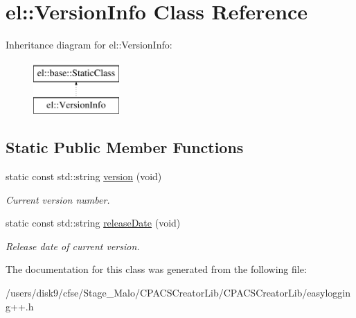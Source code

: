 \hypertarget{classel_1_1VersionInfo}{\section{el\-:\-:Version\-Info Class Reference}
\label{classel_1_1VersionInfo}
}
Inheritance diagram for el\-:\-:Version\-Info\-:\begin{figure}[H]
\begin{center}
\leavevmode
\includegraphics[height=2.000000cm]{classel_1_1VersionInfo}
\end{center}
\end{figure}
\subsection*{Static Public Member Functions}
\begin{DoxyCompactItemize}
\item 
\hypertarget{classel_1_1VersionInfo_a6fee512d52168445b2118ff2b31b4058}{static const std\-::string \hyperlink{classel_1_1VersionInfo_a6fee512d52168445b2118ff2b31b4058}{version} (void)}\label{classel_1_1VersionInfo_a6fee512d52168445b2118ff2b31b4058}

\begin{DoxyCompactList}\small\item\em Current version number. \end{DoxyCompactList}\item 
\hypertarget{classel_1_1VersionInfo_ab23c2545115898f4071fa4e125204946}{static const std\-::string \hyperlink{classel_1_1VersionInfo_ab23c2545115898f4071fa4e125204946}{release\-Date} (void)}\label{classel_1_1VersionInfo_ab23c2545115898f4071fa4e125204946}

\begin{DoxyCompactList}\small\item\em Release date of current version. \end{DoxyCompactList}\end{DoxyCompactItemize}


The documentation for this class was generated from the following file\-:\begin{DoxyCompactItemize}
\item 
/users/disk9/cfse/\-Stage\-\_\-\-Malo/\-C\-P\-A\-C\-S\-Creator\-Lib/\-C\-P\-A\-C\-S\-Creator\-Lib/easylogging++.\-h\end{DoxyCompactItemize}
